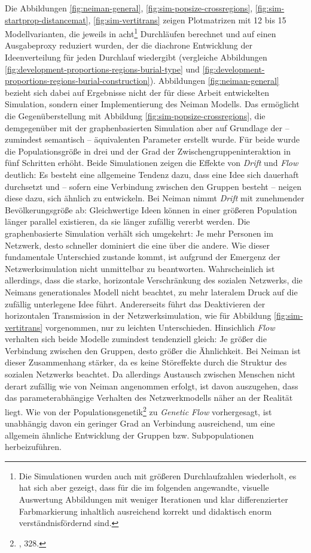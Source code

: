 \documentclass[openany,twoside,twocolumn]{book}
\let\rmarkdownfootnote\footnote%
\def\footnote{\protect\rmarkdownfootnote}
\begin{document}
Die Abbildungen \ref{fig:neiman-general},
\ref{fig:sim-popsize-crossregions}, \ref{fig:sim-startprop-distancemat},
\ref{fig:sim-vertitrans} zeigen Plotmatrizen mit 12 bis 15
Modellvarianten, die jeweils in acht\footnote{Die Simulationen wurden
  auch mit größeren Durchlaufzahlen wiederholt, es hat sich aber
  gezeigt, dass für die im folgenden angewandte, visuelle Auswertung
  Abbildungen mit weniger Iterationen und klar differenzierter
  Farbmarkierung inhaltlich ausreichend korrekt und didaktisch enorm
  verständnisfördernd sind.} Durchläufen berechnet und auf einen
Ausgabeproxy reduziert wurden, der die diachrone Entwicklung der
Ideenverteilung für jeden Durchlauf wiedergibt (vergleiche Abbildungen
\ref{fig:development-proportions-regions-burial-type} und
\ref{fig:development-proportions-regions-burial-construction}).
Abbildungen \ref{fig:neiman-general} bezieht sich dabei auf Ergebnisse
nicht der für diese Arbeit entwickelten Simulation, sondern einer
Implementierung des Neiman Modells. Das ermöglicht die Gegenüberstellung
mit Abbildung \ref{fig:sim-popsize-crossregions}, die demgegenüber mit
der graphenbasierten Simulation aber auf Grundlage der -- zumindest
semantisch -- äquivalenten Parameter erstellt wurde. Für beide wurde die
Populationsgröße in drei und der Grad der Zwischengruppeninteraktion in
fünf Schritten erhöht. Beide Simulationen zeigen die Effekte von
\emph{Drift} und \emph{Flow} deutlich: Es besteht eine allgemeine
Tendenz dazu, dass eine Idee sich dauerhaft durchsetzt und -- sofern
eine Verbindung zwischen den Gruppen besteht -- neigen diese dazu, sich
ähnlich zu entwickeln. Bei Neiman nimmt \emph{Drift} mit zunehmender
Bevölkerungsgröße ab: Gleichwertige Ideen können in einer größeren
Population länger parallel existieren, da sie länger zufällig vererbt
werden. Die graphenbasierte Simulation verhält sich umgekehrt: Je mehr
Personen im Netzwerk, desto schneller dominiert die eine über die
andere. Wie dieser fundamentale Unterschied zustande kommt, ist aufgrund
der Emergenz der Netzwerksimulation nicht unmittelbar zu beantworten.
Wahrscheinlich ist allerdings, dass die starke, horizontale
Verschränkung des sozialen Netzwerks, die Neimans generationales Modell
nicht beachtet, zu mehr lateralem Druck auf die zufällig unterlegene
Idee führt. Andererseits führt das Deaktivieren der horizontalen
Transmission in der Netzwerksimulation, wie für Abbildung
\ref{fig:sim-vertitrans} vorgenommen, nur zu leichten Unterschieden.
Hinsichlich \emph{Flow} verhalten sich beide Modelle zumindest
tendenziell gleich: Je größer die Verbindung zwischen den Gruppen, desto
größer die Ähnlichkeit. Bei Neiman ist dieser Zusammenhang stärker, da
es keine Störeffekte durch die Struktur des sozialen Netzwerks beachtet.
Da allerdings Austausch zwischen Menschen nicht derart zufällig wie von
Neiman angenommen erfolgt, ist davon auszugehen, dass das
parameterabhängige Verhalten des Netzwerkmodells näher an der Realität
liegt. Wie von der Populationsgenetik\footnote{\textcite{frankham_introduction_2002},
  328.} zu \emph{Genetic Flow} vorhergesagt, ist unabhängig davon ein
geringer Grad an Verbindung ausreichend, um eine allgemein ähnliche
Entwicklung der Gruppen bzw. Subpopulationen herbeizuführen.
\end{document}
